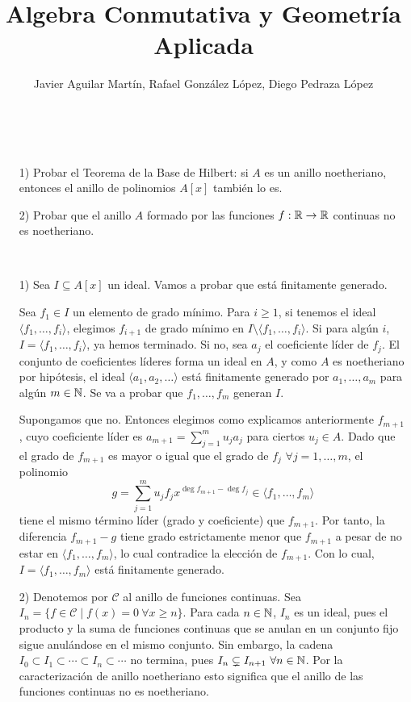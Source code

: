 \documentclass[twoside]{article}
\begin{document}
\title{Algebra Conmutativa y Geometría Aplicada}
\author{Javier Aguilar Martín, Rafael González López, Diego Pedraza López}
\maketitle

\begin{ejercicio}{1}\
\begin{itemize}

\item[1)] Probar el Teorema de la Base de Hilbert: si $A$ es un anillo
noetheriano, entonces el anillo de polinomios $A[x]$ también lo es.

\item[2)] Probar que el anillo $A$ formado por las funciones $f : \mathbb{R} \to \mathbb{R}$ continuas
no es noetheriano.
\end{itemize}
\end{ejercicio}
\begin{solucion}\
\begin{itemize}


\item[1)]Sea $I\subseteq A[x]$ un ideal. Vamos a probar que está finitamente generado. 

Sea $f_1\in I$ un elemento de grado mínimo. Para $i\geq 1$, si tenemos el ideal $\langle f_1,\dots, f_i\rangle$, elegimos $f_{i+1}$ de grado mínimo en $I\setminus\langle f_1,\dots, f_i\rangle$. Si para algún $i$, $I=\langle f_1,\dots, f_i\rangle$, ya hemos terminado. Si no, sea $a_j$ el coeficiente líder de $f_j$. El conjunto de coeficientes líderes forma un ideal en $A$, y como $A$ es noetheriano por hipótesis, el ideal $\langle a_1,a_2,\dots\rangle$ está finitamente generado por $a_1,\dots,a_m$ para algún $m\in\mathbb{N}$. Se va a probar que $f_1,\dots,f_m$ generan $I$.

Supongamos que no. Entonces elegimos como explicamos anteriormente $f_{m+1}$, cuyo coeficiente líder es $a_{m+1}=\sum_{j=1}^m u_j a_j$ para ciertos $u_j\in A$. Dado que el grado de $f_{m+1}$ es mayor o igual que el grado de $f_j$ $\forall j=1,\dots, m$, el polinomio
$$g=\sum_{j=1}^m u_j f_j x^{\deg{f_{m+1}}-\deg{f_j}}\in\langle f_1,\dots,f_m\rangle$$
tiene el mismo término líder (grado y coeficiente) que $f_{m+1}$. Por tanto, la diferencia $f_{m+1}-g$ tiene grado estrictamente menor que $f_{m+1}$ a pesar de no estar en $\langle f_1,\dots,f_m\rangle$, lo cual contradice la elección de $f_{m+1}$. Con lo cual, $I=\langle f_1,\dots,f_m\rangle$ está finitamente generado.

\item[2)] Denotemos por $\mathcal{C}$ al anillo de funciones continuas. Sea $I_n=\{f\in\mathcal{C}\mid f(x)=0\ \forall x\geq n\}$. Para cada $n\in\mathbb{N}$, $I_n$ es un ideal, pues el producto y la suma de funciones continuas que se anulan en un conjunto fijo sigue anulándose en el mismo conjunto. Sin embargo, la cadena $I_0\subset I_1\subset\cdots\subset I_n\subset\cdots$ no termina, pues $I_{n}\subsetneq I_{n+1}\ \forall n\in\N$. Por la caracterización de anillo noetheriano esto significa que el anillo de las funciones continuas no es noetheriano. 
\end{itemize}
\end{solucion}
\end{document}
